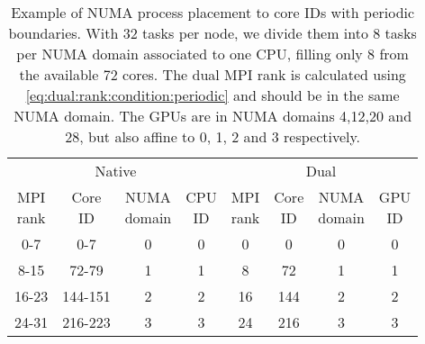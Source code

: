 \begin{table}[h]
\centering
\begin{tabular}{cccccccc}
\multicolumn{4}{c}{Native} & \multicolumn{4}{c}{Dual} \\
\cmidrule(lr){1-4}
\cmidrule(lr){5-8} 
\makecell{MPI\\rank} &
\makecell{Core\\ID} &
\makecell{NUMA\\domain} &
\makecell{CPU\\ID} &
\makecell{MPI\\rank} &
\makecell{Core\\ID} &
\makecell{NUMA\\domain} &
\makecell{GPU\\ID} \\
\cmidrule(lr){1-4}
\cmidrule(lr){5-8} 
0-7   & 0-7     & 0 & 0 & 0  & 0   & 0 & 0 \\
8-15  & 72-79   & 1 & 1 & 8  & 72  & 1 & 1 \\
16-23 & 144-151 & 2 & 2 & 16 & 144 & 2 & 2 \\
24-31 & 216-223 & 3 & 3 & 24 & 216 & 3 & 3 \\
\end{tabular}
\caption{Example of NUMA process placement to core IDs with periodic boundaries. With \num{32} tasks per node, we divide them into \num{8} tasks per NUMA domain associated to one CPU, filling only \num{8} from the available \num{72} cores. The dual MPI rank is calculated using \cref{eq:dual:rank:condition:periodic} and should be in the same NUMA domain. The GPUs are in NUMA domains \num{4},\num{12},\num{20} and \num{28}, but also affine to \num{0}, \num{1}, \num{2} and \num{3} respectively.}
\label{tab:perf:numa:periodic}
\end{table}

